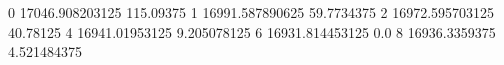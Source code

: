 0 17046.908203125 115.09375
1 16991.587890625 59.7734375
2 16972.595703125 40.78125
4 16941.01953125 9.205078125
6 16931.814453125 0.0
8 16936.3359375 4.521484375
